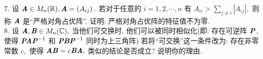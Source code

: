 \documentclass[UTF8]{ctexart}
\begin{document}
7. 设 $\textbf{\textit{A}} \in M_n(\mathbb{R}), \textbf{\textit{A}}=\left( A_{ij}\right).$ 若对于任意的 $i=1,2,\cdots,n$ 有 $A_{ii} > \sum \limits_{j\neq i}\left|A_{ij}\right|,$ 则称 $\textbf{\textit{A}}$ 是“严格对角占优阵”. 证明: 严格对角占优阵的特征值不为零.
\\

8. 设 $\textbf{\textit{A}},\textbf{\textit{B}} \in M_n(\mathbb{C}),$ 当他们可交换时, 他们可以被同时相似化(即: 存在可逆阵 $\textbf{\textit{P}}$, 使得 $\textbf{\textit{PAP}}^{-1}$ 和 $\textbf{\textit{PBP}}^{-1}$ 同时为上三角阵) 若将“可交换”这一条件改为: 存在非零常数 $c,$ 使得 $\textbf{\textit{AB}}=c\textbf{\textit{BA}},$ 类似的结论是否成立? 说明你的理由.
\end{document}
